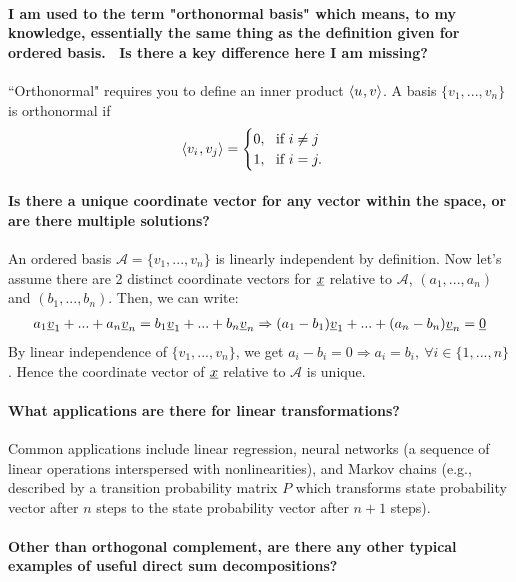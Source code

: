 \documentclass[10pt,english]{article}
\begin{document}
\paragraph{I am used to the term "orthonormal basis" which means, to my knowledge, essentially the same thing as the definition given for ordered basis.  Is there a key difference here I am missing?}

``Orthonormal" requires you to define an inner product ${\langle  u  \mskip1mu ,  v  \rangle}$.
A basis $\{v_1,...,v_n\}$ is orthonormal if \[{\langle  v_i  \mskip1mu ,  v_j \rangle} = \begin{cases} 0,~~ \text{if}~ i\neq j\\ 1, ~~ \text{if}~i=j.\end{cases} \]

\paragraph{Is there a unique coordinate vector for any vector within the space, or are there multiple solutions?}

An ordered basis $\mathcal{A}=\{v_1,...,v_n\}$ is linearly independent by definition. Now let's assume there are 2 distinct coordinate vectors for $\underline{x}$ relative to $\mathcal{A}$, $(a_1,...,a_n)$ and $(b_1,...,b_n)$.
Then, we can write:
\begin{align}
    a_1\underline{v}_1 + ... + a_n\underline{v}_n = b_1\underline{v}_1 + ... + b_n \underline{v}_n \Rightarrow (a_1-b_1)\underline{v}_1 + ... + (a_n-b_n)\underline{v}_n = \underline{0}
\end{align}
By linear independence of $\{v_1,...,v_n\}$, we get $a_i-b_i = 0 \Rightarrow a_i = b_i,~\forall i \in \{1,...,n\}$. Hence the coordinate vector of $\underline{x}$ relative to $\mathcal{A}$ is unique.

\paragraph{What applications are there for linear transformations?}
Common applications include linear regression, neural networks (a sequence of linear operations interspersed with nonlinearities), and Markov chains (e.g., described by a transition probability matrix $P$ which transforms state probability vector after $n$ steps to the state probability vector after $n+1$ steps).

\paragraph{Other than orthogonal complement, are there any other typical examples of useful direct sum decompositions?}
\end{document}
